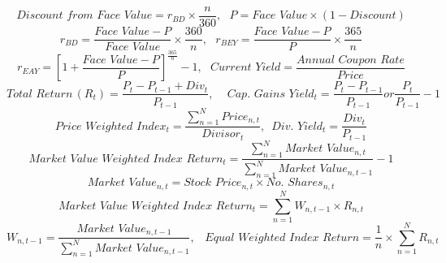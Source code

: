 $$Discount \,\, from \,\, Face \,\, Value = r_{BD} \times \frac{n}{360}, \,\,\,\, P = Face\,\, Value \times (1- Discount)$$
$$r_{BD} = \frac{Face \,\, Value - P}{Face \,\, Value}\times \frac{360}{n},\,\,\,\, r_{BEY} = \frac{Face \,\, Value - P}{P}\times \frac{365}{n}$$
$$r_{EAY} = \left[1 + \frac{Face \,\, Value - P}{P} \right]^{\frac{365}{n}}-1, \,\,\,\, Current \,\, Yield = \frac{Annual \,\, Coupon \,\, Rate}{Price}$$
$$Total \,\, Return \, (R_{t}) = \frac{P_{t}-P_{t-1}+Div_{t}}{P_{t-1}},  \,\,\,\,\,\,\, Cap. \,\, Gains \,\, Yield_{t} = \frac{P_{t}- P_{t-1}}{P_{t-1}} or \frac{P_{t}}{P_{t-1}}-1$$
$$Price \,\, Weighted \,\, Index_{t} = \frac{\sum_{n=1}^{N}Price_{n,t}}{Divisor_{t}},\,\,\, Div. \,\, Yield_{t} = \frac{Div_{t}}{P_{t-1}}$$
$$Market \,\, Value \,\, Weighted \,\, Index \,\, Return_{t} = \frac{\sum_{n=1}^{N}Market \,\, Value_{n,t}}{\sum_{n=1}^{N}Market \,\, Value_{n,t-1}}-1$$
$$Market \,\, Value_{n,t} = Stock \,\, Price_{n,t} \times No. \,\, Shares_{n,t}$$
$$Market \,\, Value \,\, Weighted \,\, Index \,\, Return_{t} = \sum_{n=1}^{N} W_{n,t-1}\times R_{n,t}$$
$$W_{n,t-1} = \frac{Market \,\, Value_{n,t-1}}{\sum_{n=1}^{N}Market \,\, Value_{n,t-1}}, \,\,\,\,\, Equal \,\, Weighted \,\, Index \,\, Return = \frac{1}{n}\times \sum_{n=1}^{N}R_{n,t}$$